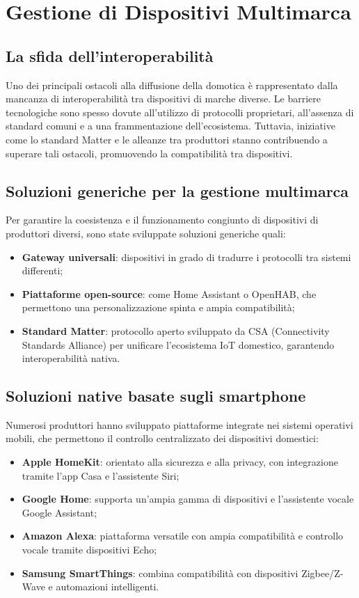 \chapter{Gestione di Dispositivi Multimarca}
\section{La sfida dell’interoperabilità}
Uno dei principali ostacoli alla diffusione della domotica è rappresentato dalla mancanza di interoperabilità tra dispositivi di marche diverse. Le barriere tecnologiche sono spesso dovute all’utilizzo di protocolli proprietari, all’assenza di standard comuni e a una frammentazione dell’ecosistema. Tuttavia, iniziative come lo standard Matter e le alleanze tra produttori stanno contribuendo a superare tali ostacoli, promuovendo la compatibilità tra dispositivi.

\section{Soluzioni generiche per la gestione multimarca}
Per garantire la coesistenza e il funzionamento congiunto di dispositivi di produttori diversi, sono state sviluppate soluzioni generiche quali:
\begin{itemize}
    \item \textbf{Gateway universali}: dispositivi in grado di tradurre i protocolli tra sistemi differenti;
    \item \textbf{Piattaforme open-source}: come Home Assistant o OpenHAB, che permettono una personalizzazione spinta e ampia compatibilità;
    \item \textbf{Standard Matter}: protocollo aperto sviluppato da CSA (Connectivity Standards Alliance) per unificare l’ecosistema IoT domestico, garantendo interoperabilità nativa.
\end{itemize}

\section{Soluzioni native basate sugli smartphone}
Numerosi produttori hanno sviluppato piattaforme integrate nei sistemi operativi mobili, che permettono il controllo centralizzato dei dispositivi domestici:
\begin{itemize}
    \item \textbf{Apple HomeKit}: orientato alla sicurezza e alla privacy, con integrazione tramite l’app Casa e l’assistente Siri;
    \item \textbf{Google Home}: supporta un’ampia gamma di dispositivi e l’assistente vocale Google Assistant;
    \item \textbf{Amazon Alexa}: piattaforma versatile con ampia compatibilità e controllo vocale tramite dispositivi Echo;
    \item \textbf{Samsung SmartThings}: combina compatibilità con dispositivi Zigbee/Z-Wave e automazioni intelligenti.
\end{itemize}

